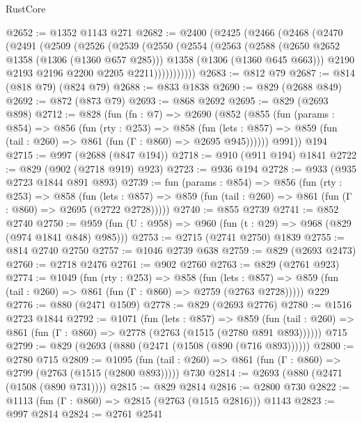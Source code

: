 \begin{lexlean}{RustCore}
\begin{coremodule}
@2652 := @1352 @1143 @271
@2682 := @2400
    (@2425
      (@2466
        (@2468
          (@2470
            (@2491
              (@2509
                (@2526
                  (@2539
                    (@2550
                      (@2554
                        (@2563
                          (@2588
                            (@2650 @2652 @1358 (@1306 (@1360 @657 @285)))
                            @1358
                            (@1306 (@1360 @645 @663)))
                          @2190
                          @2193
                          @2196
                          @2200
                          @2205
                          @2211)))))))))))
@2683 := @812 @79
@2687 := @814 (@818 @79) (@824 @79)
@2688 := @833 @1838
@2690 := @829 (@2688 @849)
@2692 := @872 (@873 @79)
@2693 := @868 @2692
@2695 := @829 (@2693 @898)
@2712 := @828
    (fun (fn : @7) =>
    @2690
      (@852
        (@855
          (fun (params : @854) =>
          @856
            (fun (rty : @253) =>
            @858
              (fun (lets : @857) =>
              @859 (fun (tail : @260) => @861 (fun (Γ : @860) => @2695 @945))))))
        @991))
    @194
@2715 := @997 (@2688 (@847 @194))
@2718 := @910 (@911 @194) @1841
@2722 := @829 (@902 (@2718 @919) @923)
@2723 := @936 @194
@2728 := @933 (@935 @2723 @1844 @891 @893)
@2739 := fun (params : @854) =>
  @856
    (fun (rty : @253) =>
    @858
      (fun (lets : @857) =>
      @859 (fun (tail : @260) => @861 (fun (Γ : @860) => @2695 (@2722 @2728)))))
@2740 := @855 @2739
@2741 := @852 @2740
@2750 := @959 (fun (U : @958) => @960 (fun (t : @29) => @968 (@829 (@974 @1841 @848) @985)))
@2753 := @2715 (@2741 @2750) @1839
@2755 := @814 @2740 @2750
@2757 := @1046 @2739 @638
@2759 := @829 (@2693 @2473)
@2760 := @2718 @2476
@2761 := @902 @2760
@2763 := @829 (@2761 @923)
@2774 := @1049
    (fun (rty : @253) =>
    @858
      (fun (lets : @857) =>
      @859 (fun (tail : @260) => @861 (fun (Γ : @860) => @2759 (@2763 @2728)))))
    @229
@2776 := @880 (@2471 @1509)
@2778 := @829 (@2693 @2776)
@2780 := @1516 @2723 @1844
@2792 := @1071
    (fun (lets : @857) =>
    @859 (fun (tail : @260) => @861 (fun (Γ : @860) => @2778 (@2763 (@1515 (@2780 @891 @893))))))
    @715
@2799 := @829 (@2693 (@880 (@2471 (@1508 (@890 (@716 @893))))))
@2800 := @2780 @715
@2809 := @1095
    (fun (tail : @260) => @861 (fun (Γ : @860) => @2799 (@2763 (@1515 (@2800 @893)))))
    @730
@2814 := @2693 (@880 (@2471 (@1508 (@890 @731))))
@2815 := @829 @2814
@2816 := @2800 @730
@2822 := @1113 (fun (Γ : @860) => @2815 (@2763 (@1515 @2816))) @1143
@2823 := @997 @2814
@2824 := @2761 @2541

\end{coremodule}
\end{lexlean}
